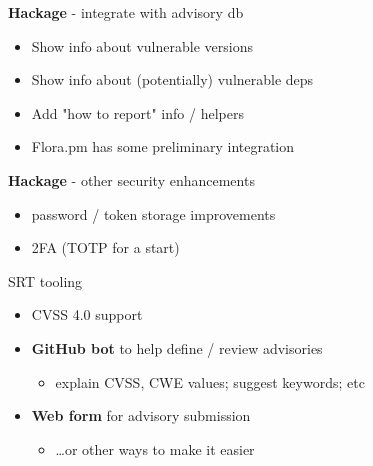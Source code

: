 \documentclass[ignorenonframetext,aspectratio=169,12pt]{beamer}
\begin{document}
\begin{frame}{{\bf Hackage} - integrate with advisory db}
  \begin{itemize}
    \item Show info about vulnerable versions
    \item Show info about (potentially) vulnerable deps
    \item Add "how to report" info / helpers
    \item Flora.pm has some preliminary integration
  \end{itemize}
\end{frame}

\begin{frame}{{\bf Hackage} - other security enhancements}
  \begin{itemize}
    \item password / token storage improvements
    \item 2FA (TOTP for a start)
  \end{itemize}
\end{frame}

\begin{frame}{SRT tooling}
  \begin{itemize}
    \item CVSS 4.0 support
    \item {\bf GitHub bot} to help define / review advisories
      \begin{itemize}
        \item explain CVSS, CWE values; suggest keywords; etc
      \end{itemize}
    \item {\bf Web form} for advisory submission
      \begin{itemize}
        \item \ldots{}or other ways to make it easier
      \end{itemize}
  \end{itemize}
\end{frame}
\end{document}
